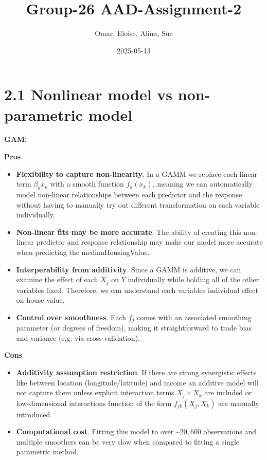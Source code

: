 \documentclass[
]{article}
\title{Group-26 AAD-Assignment-2}
\author{Omar, Eloise, Alina, Sue}
\date{2025-05-13}
\begin{document}
\maketitle

{
\setcounter{tocdepth}{4}
\tableofcontents
}
\section{2.1 Nonlinear model vs non-parametric
model}\label{nonlinear-model-vs-non-parametric-model}

\noindent \large \textbf{GAM:} \normalsize

\noindent \textbf{Pros}

\begin{itemize}
  \item \textbf{Flexibility to capture non-linearity}. In a GAMM we replace each linear term $\beta_{k} x_{k}$ with a smooth function $f_{k}(x_{k})$,     meaning we can automatically model non-linear relationships between each predictor and the response without having to manually try out different      transformation on each variable individually.
  \item \textbf{Non-linear fits may be more accurate}. The ability of creating this non-linear predictor and response relationship may make our model     more accurate when predicting the medianHousingValue.
  \item \textbf{Interperability from additivity}. Since a GAMM is additive, we can examine the effect of each $X_j$ on $Y$ individually while holding      all of the other variables fixed. Therefore, we can understand each variables individual effect on house value.
  \item \textbf{Control over smoothness}. Each $f_j$ comes with an associated smoothing parameter (or degrees of freedom), making it straightforward      to trade bias and variance  (e.g. via cross-validation).
\end{itemize}

\noindent \textbf{Cons}

\begin{itemize}
  \item \textbf{Additivity assumption restriction}. If there are strong synergistic effects like between location (longitude/latitude) and income         \textendash an additive model will not capture them unless explicit interaction terms $X_j \times X_k$ are included or low-dimensional               interactions function of the form $f_{jk}(X_j, X_k)$ are manually introduced. 
  \item \textbf{Computational cost}. Fitting this model to over \textasciitilde$20,600$ observations and multiple smoothers can be very slow when        compared to fitting a single parametric method.
\end{itemize}
\end{document}
